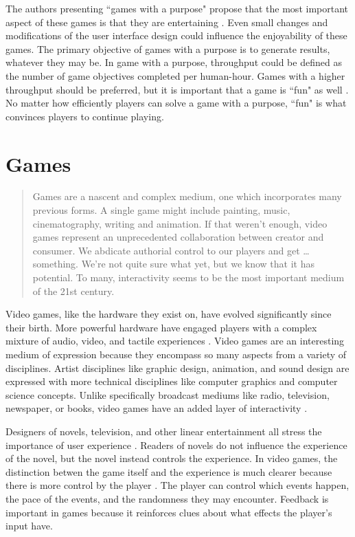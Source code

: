 The authors presenting ``games with a purpose" propose that the most important aspect of these games is that they are entertaining \cite{gwap}. Even small changes and modifications of the user interface design could influence the enjoyability of these games. The primary objective of games with a purpose is to generate results, whatever they may be. In game with a purpose, throughput could be defined as the number of game objectives completed per human-hour. Games with a higher throughput should be preferred, but it is important that a game is ``fun" as well \cite{gwap}. No matter how efficiently players can solve a game with a purpose, ``fun" is what convinces players to continue playing.

\section{Games}

\begin{quote}
Games are a nascent and complex medium, one which incorporates many previous forms. A single game might include painting, music, cinematography, writing and animation. If that weren’t enough, video games represent an unprecedented collaboration between creator and consumer. We abdicate authorial control to our players and get … something. We’re not quite sure what yet, but we know that it has potential. To many, interactivity seems to be the most important medium of the 21st century. \cite{swink2009game}
\end{quote}

Video games, like the hardware they exist on, have evolved significantly since their birth. More powerful hardware have engaged players with a complex mixture of audio, video, and tactile experiences \cite{atanasov}. Video games are an interesting medium of expression because they encompass so many aspects from a variety of disciplines. Artist disciplines like graphic design, animation, and sound design are expressed with more technical disciplines like computer graphics and computer science concepts. Unlike specifically broadcast mediums like radio, television, newspaper, or books, video games have an added layer of interactivity \cite{schell2008art}.

Designers of novels, television, and other linear entertainment all stress the importance of user experience \cite{schell2008art}. Readers of novels do not influence the experience of the novel, but the novel instead controls the experience. In video games, the distinction betwen the game itself and the experience is much clearer because there is more control by the player \cite{schell2008art}. The player can control which events happen, the pace of the events, and the randomness they may encounter. Feedback is important in games because it reinforces clues about what effects the player's input have.

